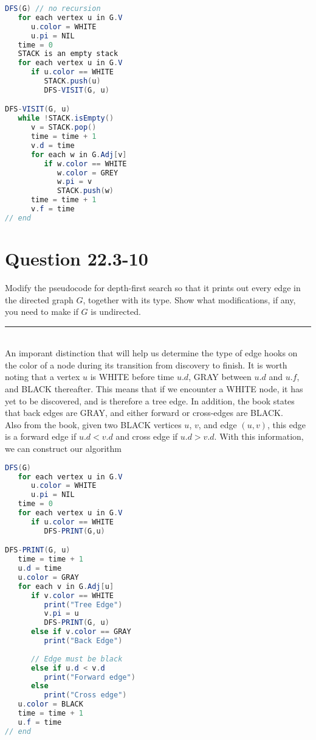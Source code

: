 \documentclass[20pt]{article} %
\begin{document}
\begin{lstlisting}[language=java]
DFS(G) // no recursion
   for each vertex u in G.V
      u.color = WHITE
      u.pi = NIL
   time = 0
   STACK is an empty stack
   for each vertex u in G.V
      if u.color == WHITE
         STACK.push(u)
         DFS-VISIT(G, u)

DFS-VISIT(G, u)
   while !STACK.isEmpty()
      v = STACK.pop()
      time = time + 1
      v.d = time
      for each w in G.Adj[v]
         if w.color == WHITE
            w.color = GREY
            w.pi = v
            STACK.push(w)
      time = time + 1
      v.f = time
// end
\end{lstlisting}

\newpage
\section{Question 22.3-10} 
Modify the pseudocode for depth-first search so that it prints out every edge in the directed graph $G$, together with its type. Show what modifications, if any, you need to make if $G$ is undirected. \\
\noindent\rule{2cm}{0.4pt} \\

An imporant distinction that will help us determine the type of edge hooks on the color of a node during its transition from discovery to finish.  It is worth noting that a vertex $u$ is WHITE before time $u.d$, GRAY between $u.d$ and $u.f$, and BLACK thereafter.  This means that if we encounter a WHITE node, it has yet to be discovered, and is therefore a tree edge.  In addition, the book states that back edges are GRAY, and either forward or cross-edges are BLACK.  \\

Also from the book, given two BLACK vertices $u$, $v$, and edge $(u,v)$, this edge is a forward edge if $u.d < v.d$ and cross edge if $u.d > v.d$.  With this information, we can construct our algorithm

\begin{lstlisting}[language=java]
DFS(G)
   for each vertex u in G.V
      u.color = WHITE
      u.pi = NIL
   time = 0
   for each vertex u in G.V
      if u.color == WHITE
         DFS-PRINT(G,u)

DFS-PRINT(G, u)
   time = time + 1
   u.d = time
   u.color = GRAY
   for each v in G.Adj[u]
      if v.color == WHITE
         print("Tree Edge")
         v.pi = u
         DFS-PRINT(G, u)
      else if v.color == GRAY
         print("Back Edge")
      
      // Edge must be black
      else if u.d < v.d
         print("Forward edge")
      else
         print("Cross edge")
   u.color = BLACK
   time = time + 1
   u.f = time
// end
\end{lstlisting}
\end{document}
